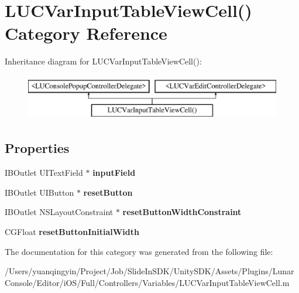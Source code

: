 \hypertarget{category_l_u_c_var_input_table_view_cell_07_08}{}\section{L\+U\+C\+Var\+Input\+Table\+View\+Cell() Category Reference}
\label{category_l_u_c_var_input_table_view_cell_07_08}
Inheritance diagram for L\+U\+C\+Var\+Input\+Table\+View\+Cell()\+:\begin{figure}[H]
\begin{center}
\leavevmode
\includegraphics[height=2.000000cm]{category_l_u_c_var_input_table_view_cell_07_08}
\end{center}
\end{figure}
\subsection*{Properties}
\begin{DoxyCompactItemize}
\item 
\mbox{\label{category_l_u_c_var_input_table_view_cell_07_08_aa0620e4f87a25ea7f954f54a65b7a8bd}} 
I\+B\+Outlet U\+I\+Text\+Field $\ast$ {\bfseries input\+Field}
\item 
\mbox{\label{category_l_u_c_var_input_table_view_cell_07_08_ac2f53ffc0db602965e4342e459fbc445}} 
I\+B\+Outlet U\+I\+Button $\ast$ {\bfseries reset\+Button}
\item 
\mbox{\label{category_l_u_c_var_input_table_view_cell_07_08_a3ac18c106a35ec25121451cd7e92a7ab}} 
I\+B\+Outlet N\+S\+Layout\+Constraint $\ast$ {\bfseries reset\+Button\+Width\+Constraint}
\item 
\mbox{\label{category_l_u_c_var_input_table_view_cell_07_08_ae96004e1394683a118c3cc7325fefc21}} 
C\+G\+Float {\bfseries reset\+Button\+Initial\+Width}
\end{DoxyCompactItemize}


The documentation for this category was generated from the following file\+:\begin{DoxyCompactItemize}
\item 
/\+Users/yuanqingyin/\+Project/\+Job/\+Slide\+In\+S\+D\+K/\+Unity\+S\+D\+K/\+Assets/\+Plugins/\+Lunar\+Console/\+Editor/i\+O\+S/\+Full/\+Controllers/\+Variables/L\+U\+C\+Var\+Input\+Table\+View\+Cell.\+m\end{DoxyCompactItemize}
